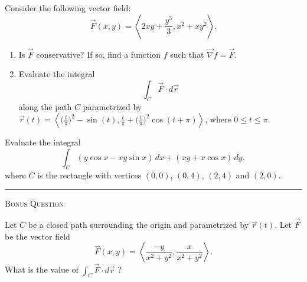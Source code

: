 \documentclass[addpoints, 12pt]{exam}%
\theoremstyle{definition}
\begin{document}
\begin{questions}
\newpage

\question[10]
Consider the following vector field:
  \[
    \vec{F} (x, y) = \left\langle 2x y + \frac{y^3}{3} , x^2 + xy^2 \right\rangle .
  \]
\begin{enumerate}[label=(\alph*)]
  \item Is $\vec{F}$ conservative? If so, find a function $f$ such that $\vec{\nabla} f = \vec{F}$.
  \item Evaluate the integral
    \[
       \int_C \vec{F} \cdot d \vec{r}
     \] 
  along the path $C$ parametrized by $\vec{r} (t) = \left\langle \big( \tfrac{t}{\pi} \big)^2 - \sin (t) , \tfrac{t}{\pi} + \big( \frac{t}{\pi} \big)^2 \cos (t + \pi ) \right\rangle$, where $0 \leq t \leq \pi$.
\end{enumerate}

\newpage

\question[10]
Evaluate the integral
  \[
    \int_C (y \cos x - xy \sin x) \, dx + (xy + x \cos x) \, dy ,
  \]
where $C$ is the rectangle with vertices $(0, 0)$, $(0, 4)$, $(2, 4)$ and $(2, 0)$. 

\newpage

\rule{0.3\textwidth}{.4pt} \hspace*{0.2cm} \begin{large}{\textsc{Bonus Question}} \end{large} \hspace*{0.2cm} \hrulefill 

Let $C$ be a closed path surrounding the origin and parametrized by $\vec{r} (t)$. Let $\vec{F}$ be the vector field
  \[
    \vec{F} (x ,y) = \left\langle \frac{-y}{x^2 + y^2}, \frac{x}{x^2 + y^2} \right\rangle .
  \]
What is the value of $\displaystyle \int_C \vec{F} \cdot d \vec{r}$ ?

\end{questions}
\end{document}
